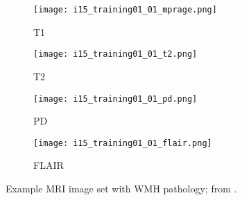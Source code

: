 \begin{figure}
  \centering
  \begin{subfigure}{0.24\textwidth}\texttt{[image: i15\_training01\_01\_mprage.png]}\caption{T1}  \label{fig:4mriT1}\end{subfigure}
  \begin{subfigure}{0.24\textwidth}\texttt{[image: i15\_training01\_01\_t2.png]}\caption{T2}      \label{fig:4mriT2}\end{subfigure}
  \begin{subfigure}{0.24\textwidth}\texttt{[image: i15\_training01\_01\_pd.png]}\caption{PD}      \label{fig:4mriPD}\end{subfigure}
  \begin{subfigure}{0.24\textwidth}\texttt{[image: i15\_training01\_01\_flair.png]}\caption{FLAIR}\label{fig:4mriIR}\end{subfigure}
  \caption{Example MRI image set with WMH pathology; from \cite{WMHSEG2017}.}
  \label{fig:4mri}
\end{figure}
